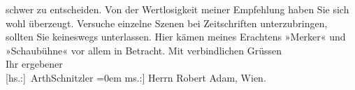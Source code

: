 \begin{ledgroupsized}[t]{13cm}
               schwer zu entscheiden. Von der Wertlosigkeit meiner Empfehlung haben Sie sich wohl
               überzeugt. Versuche einzelne Szenen bei Zeitschriften unterzubringen, sollten Sie
               keineswegs unterlassen. Hier kämen meines Erachtens »Merker« und »Schaubühne« vor allem in
               Betracht.\pend
           \pstart
           Mit verbindlichen Grüssen{\\[\baselineskip]}Ihr ergebener{\\[\baselineskip]}\spacefill\mbox{{[}hs.:{]} ArthSchnitzler}\pend
           \leftskip=0em{}\pstart
           \noindent{}{[}ms.:{]} Herrn Robert Adam, Wien.\pend
           
         
         \endnumbering{}\end{ledgroupsized}  \newcommand{\dateiname}{L02010}\newcommand{\titel}{Arthur Schnitzler an Robert Adam, 11. 2. 1911}\newcommand{\editorInnen}{Martin Anton Müller und Gerd-Hermann Susen}
      